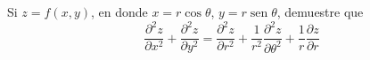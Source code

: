 \item Si $z = f(x, y)$, en donde $x = r \cos \theta$, $y = r \operatorname{sen} \theta$, demuestre que
\[ \frac{\partial^2 z}{\partial x^2} + \frac{\partial^2 z}{\partial y^2} = \frac{\partial^2 z}{\partial r^2} + \frac{1}{r^2} \frac{\partial^2 z}{\partial \theta^2} + \frac{1}{r} \frac{\partial z}{\partial r} \]
